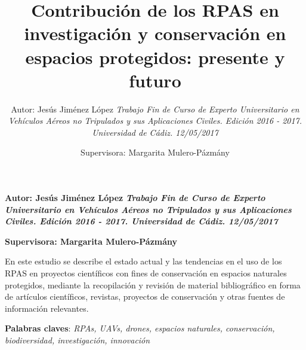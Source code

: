 \documentclass[onecolumn]{extarticle}
\title{Contribución de los RPAS en investigación y conservación en espacios
protegidos: presente y futuro\vspace{0.25in}  }
\author{\Large Autor: Jesús Jiménez López\vspace{0.05in} \newline\normalsize\emph{Trabajo Fin de Curso de Experto Universitario en Vehículos Aéreos no
Tripulados y sus Aplicaciones Civiles. Edición 2016 - 2017. Universidad
de Cádiz. 12/05/2017}   \and \Large Supervisora: Margarita Mulero-Pázmány\vspace{0.05in} \newline\normalsize\emph{}  }
\date{}
\newcommand*{\authorfont}{\fontfamily{phv}\selectfont}
\renewenvironment{abstract}
 {{%
    \setlength{\leftmargin}{0mm}
    \setlength{\rightmargin}{\leftmargin}%
  }%
  \relax}
 {\endlist}
\begin{document}
	
%

{%

\setlength{\parindent}{0pt}
\thispagestyle{plain}

{\fontsize{16}{20}\selectfont\raggedright 
\maketitle  %

}

 
{
   \vskip 13.5pt\relax \normalsize\fontsize{8}{10} 
 \textbf{\authorfont Autor: Jesús Jiménez López} \hskip 10pt \vskip 5pt  \bf\emph{\small Trabajo Fin de Curso de Experto Universitario en Vehículos Aéreos no
Tripulados y sus Aplicaciones Civiles. Edición 2016 - 2017. Universidad
de Cádiz. 12/05/2017} \vskip 5pt  \par  \textbf{\authorfont Supervisora: Margarita Mulero-Pázmány} \hskip 10pt \vskip 5pt  \bf\emph{\small } \vskip 5pt  

}

}







\begin{abstract}

    \hbox{\vrule height .2pt width 38.9pc}

    \vskip 6pt %

\noindent En este estudio se describe el estado actual y las tendencias en el uso
de los RPAS en proyectos científicos con fines de conservación en
espacios naturales protegidos, mediante la recopilación y revisión de
material bibliográfico en forma de artículos científicos, revistas,
proyectos de conservación y otras fuentes de información relevantes.


\vskip 8pt \noindent \textbf{Palabras claves}: \emph{RPAs, UAVs, drones, espacios naturales, conservación, biodiversidad,
investigación, innovación} \par

    \hbox{\vrule height .2pt width 38.9pc}



\end{abstract}
\end{document}
